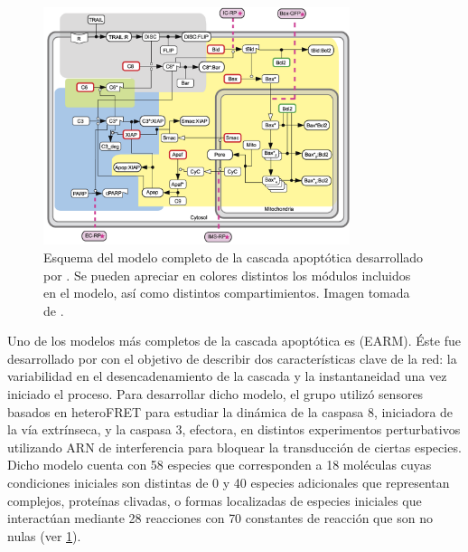 \begin{figure}
    \centering
    \includegraphics[width=0.8\textwidth]{img/cap_1/ModeloCompleto.png}
    \caption{\footnotesize{Esquema del modelo completo de la cascada apoptótica desarrollado por  \cite{Albeck2008}. Se pueden apreciar en colores distintos los módulos incluidos en el modelo, así como distintos compartimientos. Imagen tomada de \cite{Albeck2008}.}}
    \label{fig:ModeloCompleto}
\end{figure}

Uno de los modelos más completos de la cascada apoptótica es  (EARM). Éste fue desarrollado por \cite{Albeck2008} con el objetivo de describir dos características clave de la red: la variabilidad en el desencadenamiento de la cascada y la instantaneidad una vez iniciado el proceso. Para desarrollar dicho modelo, el grupo utilizó sensores basados en heteroFRET para estudiar la dinámica de la caspasa 8, iniciadora de la vía extrínseca, y la caspasa 3, efectora, en distintos experimentos perturbativos utilizando ARN de interferencia para bloquear la transducción de ciertas especies. Dicho modelo cuenta con 58 especies que corresponden a 18 moléculas cuyas condiciones iniciales son distintas de 0 y 40 especies adicionales que representan complejos, proteínas clivadas, o formas localizadas de especies iniciales que interactúan mediante 28 reacciones con 70 constantes de reacción que son no nulas (ver \cref{fig:ModeloCompleto}).

